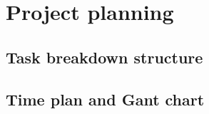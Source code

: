 \chapter{Project planning}


\section{Task breakdown structure}






\section{Time plan and Gant chart}




